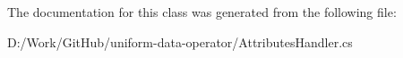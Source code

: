 The documentation for this class was generated from the following file\+:\begin{DoxyCompactItemize}
\item 
D\+:/\+Work/\+Git\+Hub/uniform-\/data-\/operator/Attributes\+Handler.\+cs\end{DoxyCompactItemize}
